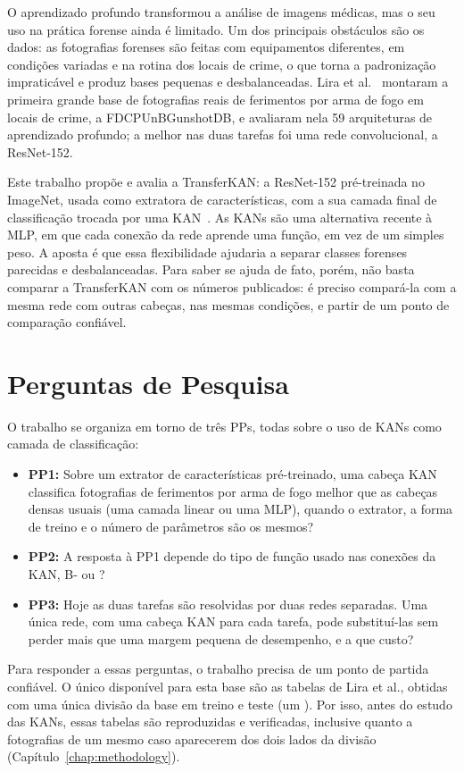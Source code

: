 O aprendizado profundo transformou a análise de imagens médicas, mas o seu uso na prática forense ainda é limitado. Um dos principais obstáculos são os dados: as fotografias forenses são feitas com equipamentos diferentes, em condições variadas e na rotina dos locais de crime, o que torna a padronização impraticável e produz bases pequenas e desbalanceadas. Lira et al.~\cite{Lira2025deep} montaram a primeira grande base de fotografias reais de ferimentos por arma de fogo em locais de crime, a FDCPUnBGunshotDB, e avaliaram nela 59 arquiteturas de aprendizado profundo; a melhor nas duas tarefas foi uma rede convolucional, a ResNet-152.

Este trabalho propõe e avalia a TransferKAN: a ResNet-152 pré-treinada no ImageNet, usada como extratora de características, com a sua camada final de classificação trocada por uma \gls{KAN}~\cite{liu2024kan}. As KANs são uma alternativa recente à \gls{MLP}, em que cada conexão da rede aprende uma função, em vez de um simples peso. A aposta é que essa flexibilidade ajudaria a separar classes forenses parecidas e desbalanceadas. Para saber se ajuda de fato, porém, não basta comparar a TransferKAN com os números publicados: é preciso compará-la com a mesma rede com outras cabeças, nas mesmas condições, e partir de um ponto de comparação confiável.

\section{Perguntas de Pesquisa}
\label{sec_goals}

O trabalho se organiza em torno de três \glspl{PP}, todas sobre o uso de KANs como camada de classificação:
\begin{itemize}
    \item \textbf{PP1:} Sobre um extrator de características pré-treinado, uma cabeça KAN classifica fotografias de ferimentos por arma de fogo melhor que as cabeças densas usuais (uma camada linear ou uma MLP), quando o extrator, a forma de treino e o número de parâmetros são os mesmos?
    \item \textbf{PP2:} A resposta à PP1 depende do tipo de função usado nas conexões da KAN, B- ou ?
    \item \textbf{PP3:} Hoje as duas tarefas são resolvidas por duas redes separadas. Uma única rede, com uma cabeça KAN para cada tarefa, pode substituí-las sem perder mais que uma margem pequena de desempenho, e a que custo?
\end{itemize}
Para responder a essas perguntas, o trabalho precisa de um ponto de partida confiável. O único disponível para esta base são as tabelas de Lira et al., obtidas com uma única divisão da base em treino e teste (um ). Por isso, antes do estudo das KANs, essas tabelas são reproduzidas e verificadas, inclusive quanto a fotografias de um mesmo caso aparecerem dos dois lados da divisão (Capítulo~\ref{chap:methodology}).

